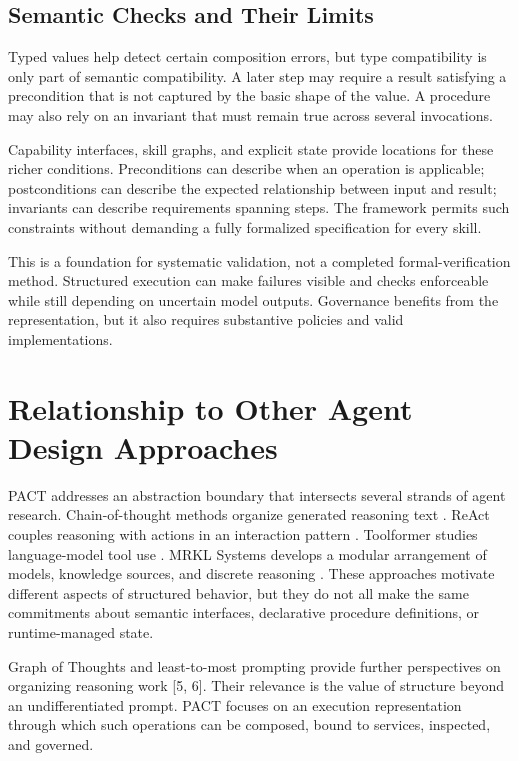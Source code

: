 \documentclass[10pt,twocolumn,a4paper]{article}
\begin{document}
\subsection{Semantic Checks and Their Limits}

Typed values help detect certain composition errors, but type compatibility is only part of semantic compatibility. A later step may require a result satisfying a precondition that is not captured by the basic shape of the value. A procedure may also rely on an invariant that must remain true across several invocations.


Capability interfaces, skill graphs, and explicit state provide locations for these richer conditions. Preconditions can describe when an operation is applicable; postconditions can describe the expected relationship between input and result; invariants can describe requirements spanning steps. The framework permits such constraints without demanding a fully formalized specification for every skill.


This is a foundation for systematic validation, not a completed formal-verification method. Structured execution can make failures visible and checks enforceable while still depending on uncertain model outputs. Governance benefits from the representation, but it also requires substantive policies and valid implementations.


\section{Relationship to Other Agent Design Approaches}

PACT addresses an abstraction boundary that intersects several strands of agent research. Chain-of-thought methods organize generated reasoning text \cite{r1}. ReAct couples reasoning with actions in an interaction pattern \cite{r2}. Toolformer studies language-model tool use \cite{r3}. MRKL Systems develops a modular arrangement of models, knowledge sources, and discrete reasoning \cite{r4}. These approaches motivate different aspects of structured behavior, but they do not all make the same commitments about semantic interfaces, declarative procedure definitions, or runtime-managed state.


Graph of Thoughts and least-to-most prompting provide further perspectives on organizing reasoning work [5, 6]. Their relevance is the value of structure beyond an undifferentiated prompt. PACT focuses on an execution representation through which such operations can be composed, bound to services, inspected, and governed.
\end{document}
